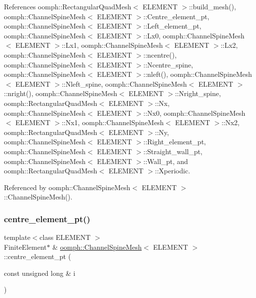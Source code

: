 References oomph\+::\+Rectangular\+Quad\+Mesh$<$ E\+L\+E\+M\+E\+N\+T $>$\+::build\+\_\+mesh(), oomph\+::\+Channel\+Spine\+Mesh$<$ E\+L\+E\+M\+E\+N\+T $>$\+::\+Centre\+\_\+element\+\_\+pt, oomph\+::\+Channel\+Spine\+Mesh$<$ E\+L\+E\+M\+E\+N\+T $>$\+::\+Left\+\_\+element\+\_\+pt, oomph\+::\+Channel\+Spine\+Mesh$<$ E\+L\+E\+M\+E\+N\+T $>$\+::\+Lx0, oomph\+::\+Channel\+Spine\+Mesh$<$ E\+L\+E\+M\+E\+N\+T $>$\+::\+Lx1, oomph\+::\+Channel\+Spine\+Mesh$<$ E\+L\+E\+M\+E\+N\+T $>$\+::\+Lx2, oomph\+::\+Channel\+Spine\+Mesh$<$ E\+L\+E\+M\+E\+N\+T $>$\+::ncentre(), oomph\+::\+Channel\+Spine\+Mesh$<$ E\+L\+E\+M\+E\+N\+T $>$\+::\+Ncentre\+\_\+spine, oomph\+::\+Channel\+Spine\+Mesh$<$ E\+L\+E\+M\+E\+N\+T $>$\+::nleft(), oomph\+::\+Channel\+Spine\+Mesh$<$ E\+L\+E\+M\+E\+N\+T $>$\+::\+Nleft\+\_\+spine, oomph\+::\+Channel\+Spine\+Mesh$<$ E\+L\+E\+M\+E\+N\+T $>$\+::nright(), oomph\+::\+Channel\+Spine\+Mesh$<$ E\+L\+E\+M\+E\+N\+T $>$\+::\+Nright\+\_\+spine, oomph\+::\+Rectangular\+Quad\+Mesh$<$ E\+L\+E\+M\+E\+N\+T $>$\+::\+Nx, oomph\+::\+Channel\+Spine\+Mesh$<$ E\+L\+E\+M\+E\+N\+T $>$\+::\+Nx0, oomph\+::\+Channel\+Spine\+Mesh$<$ E\+L\+E\+M\+E\+N\+T $>$\+::\+Nx1, oomph\+::\+Channel\+Spine\+Mesh$<$ E\+L\+E\+M\+E\+N\+T $>$\+::\+Nx2, oomph\+::\+Rectangular\+Quad\+Mesh$<$ E\+L\+E\+M\+E\+N\+T $>$\+::\+Ny, oomph\+::\+Channel\+Spine\+Mesh$<$ E\+L\+E\+M\+E\+N\+T $>$\+::\+Right\+\_\+element\+\_\+pt, oomph\+::\+Channel\+Spine\+Mesh$<$ E\+L\+E\+M\+E\+N\+T $>$\+::\+Straight\+\_\+wall\+\_\+pt, oomph\+::\+Channel\+Spine\+Mesh$<$ E\+L\+E\+M\+E\+N\+T $>$\+::\+Wall\+\_\+pt, and oomph\+::\+Rectangular\+Quad\+Mesh$<$ E\+L\+E\+M\+E\+N\+T $>$\+::\+Xperiodic.



Referenced by oomph\+::\+Channel\+Spine\+Mesh$<$ E\+L\+E\+M\+E\+N\+T $>$\+::\+Channel\+Spine\+Mesh().

\mbox{\label{classoomph_1_1ChannelSpineMesh_a127dc05f48ad6af69f26dd1504eaeba5}} 
\subsubsection{\texorpdfstring{centre\+\_\+element\+\_\+pt()}{centre\_element\_pt()}}
{\footnotesize\ttfamily template$<$class E\+L\+E\+M\+E\+NT $>$ \\
Finite\+Element$\ast$ \& \hyperlink{classoomph_1_1ChannelSpineMesh}{oomph\+::\+Channel\+Spine\+Mesh}$<$ E\+L\+E\+M\+E\+NT $>$\+::centre\+\_\+element\+\_\+pt (\begin{DoxyParamCaption}\item[{const unsigned long \&}]{i }\end{DoxyParamCaption})\hspace{0.3cm}{\ttfamily [inline]}}



